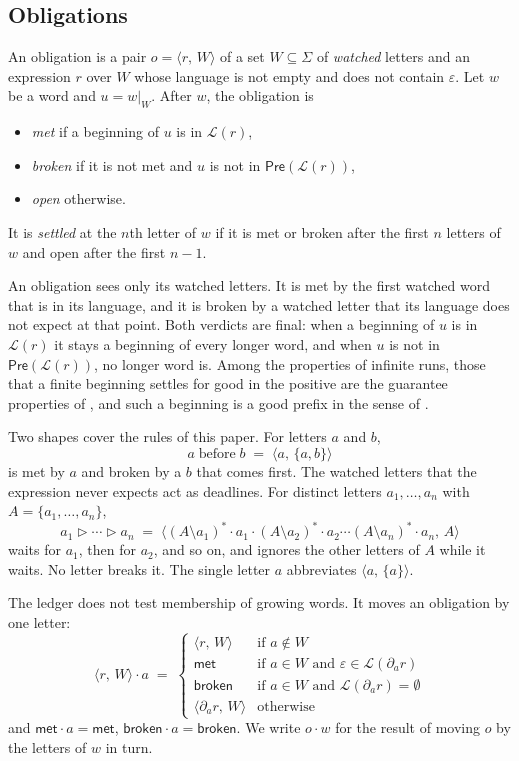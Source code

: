 \documentclass[acmsmall,nonacm,screen]{acmart}
\newcommand{\kw}[1]{\mathsf{#1}}
\newcommand{\ob}[2]{\langle #1,\, #2 \rangle}
\newcommand{\lang}[1]{\mathcal{L}(#1)}
\newcommand{\pre}[1]{\kw{Pre}(#1)}
\newcommand{\met}{\kw{met}}
\newcommand{\brk}{\kw{broken}}
\newcommand{\later}{\mathbin{\triangleright}}
\newcommand{\bef}{\mathrel{\text{before}}}
\newcommand{\dv}[2]{\partial_{#1}#2}
\newcommand{\proj}[2]{#1|_{#2}}
\begin{document}
\subsection{Obligations}

\begin{definition}[Obligation]
\label{def:ob}
An obligation is a pair $o = \ob{r}{W}$ of a set $W \subseteq \Sigma$ of \emph{watched}
letters and an expression $r$ over $W$ whose language is not empty and does not contain
$\varepsilon$. Let $w$ be a word and $u = \proj{w}{W}$. After $w$, the obligation is
\begin{itemize}
\item \emph{met} if a beginning of $u$ is in $\lang{r}$,
\item \emph{broken} if it is not met and $u$ is not in $\pre{\lang{r}}$,
\item \emph{open} otherwise.
\end{itemize}
It is \emph{settled} at the $n$th letter of $w$ if it is met or broken after the first $n$
letters of $w$ and open after the first $n - 1$.
\end{definition}

An obligation sees only its watched letters. It is met by the first watched word that is in
its language, and it is broken by a watched letter that its language does not expect at that
point. Both verdicts are final: when a beginning of $u$ is in $\lang{r}$ it stays a
beginning of every longer word, and when $u$ is not in $\pre{\lang{r}}$, no longer word is.
Among the properties of infinite runs, those that a finite beginning settles for good in
the positive are the guarantee properties of \citet{manna1990}, and such a beginning is a
good prefix in the sense of \citet{kupferman2001}.

Two shapes cover the rules of this paper. For letters $a$ and $b$,
\[
  a \bef b \;=\; \ob{a}{\{a, b\}}
\]
is met by $a$ and broken by a $b$ that comes first. The watched letters that the expression
never expects act as deadlines. For distinct letters $a_1, \ldots, a_n$ with
$A = \{a_1, \ldots, a_n\}$,
\[
  a_1 \later \cdots \later a_n \;=\;
  \ob{(A \setminus a_1)^{*} \cdot a_1 \cdot (A \setminus a_2)^{*} \cdot a_2 \cdots (A \setminus a_n)^{*} \cdot a_n}{A}
\]
waits for $a_1$, then for $a_2$, and so on, and ignores the other letters of $A$ while it
waits. No letter breaks it. The single letter $a$ abbreviates $\ob{a}{\{a\}}$.

The ledger does not test membership of growing words. It moves an obligation by one letter:
\[
  \ob{r}{W} \cdot a \;=\;
  \begin{cases}
    \ob{r}{W} & \text{if } a \notin W \\
    \met & \text{if } a \in W \text{ and } \varepsilon \in \lang{\dv{a}{r}} \\
    \brk & \text{if } a \in W \text{ and } \lang{\dv{a}{r}} = \emptyset \\
    \ob{\dv{a}{r}}{W} & \text{otherwise}
  \end{cases}
\]
and $\met \cdot a = \met$, $\brk \cdot a = \brk$. We write $o \cdot w$ for the result of
moving $o$ by the letters of $w$ in turn.
\end{document}
